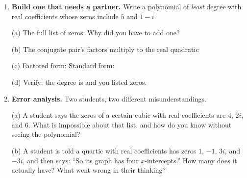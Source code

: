 \documentclass[10pt]{article}
\begin{document}
\begin{tcolorbox}[colback=white, colframe=black!40, title=\textbf{Tier A --- Approaching Proficiency},
    fonttitle=\bfseries, arc=1.5mm, left=3mm, right=3mm, top=2mm, bottom=2mm, breakable]
\begin{enumerate}[leftmargin=1.7em, itemsep=10pt]
    \vspace{2pt}
    (c) So the number of \emph{imaginary} zeros is . Check: is that number even?

    \vspace{2pt}
    (d) You did all of that \emph{without solving anything}. Explain in one sentence how the graph and
    the degree together gave you the answer. 

    \vspace{2pt}
    (e) The function is $p(x) = x^4 - 3x^2 - 4$. Factor it in quadratic form and list all four zeros
    to confirm: 

  \item \textbf{Build one that needs a partner.} Write a polynomial of \emph{least} degree with real
    coefficients whose zeros include $5$ and $1 - i$.

    \vspace{2pt}
    (a) The full list of zeros:  \; Why did you have to add one? 

    \vspace{2pt}
    (b) The conjugate pair's factors multiply to the real quadratic 

    \vspace{2pt}
    (c) Factored form:  \quad Standard form: 

    \vspace{2pt}
    (d) Verify: the degree is  and you listed  zeros. \checkmark

  \item \textbf{Error analysis.} Two students, two different misunderstandings.

    \vspace{2pt}
    (a) A student says the zeros of a certain cubic with real coefficients are $4$, $2i$, and $6$.
    What is impossible about that list, and how do you know without seeing the polynomial?

    \vspace{2pt}
    (b) A student is told a quartic with real coefficients has zeros $1$, $-1$, $3i$, and $-3i$, and
    then says: ``So its graph has four $x$-intercepts.'' How many does it actually have?
     \; What went wrong in their thinking? 
\end{enumerate}
\end{tcolorbox}
\end{document}
